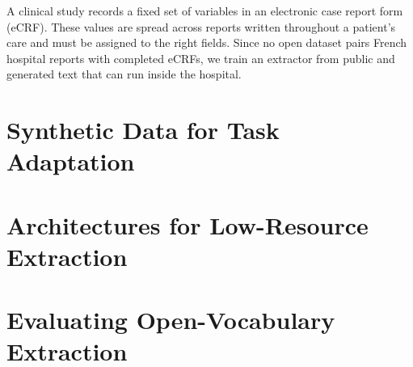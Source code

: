 
A clinical study records a fixed set of variables in an electronic case report
form (eCRF). These values are spread across reports written throughout a
patient's care and must be assigned to the right fields. Since no open dataset
pairs French hospital reports with completed eCRFs, we train an extractor from
public and generated text that can run inside the hospital.

\chapter{Synthetic Data for Task Adaptation}
\label{chap:synthetic}


\chapter{Architectures for Low-Resource Extraction}
\label{chap:architectures}


\chapter{Evaluating Open-Vocabulary Extraction}
\label{chap:evaluation}


